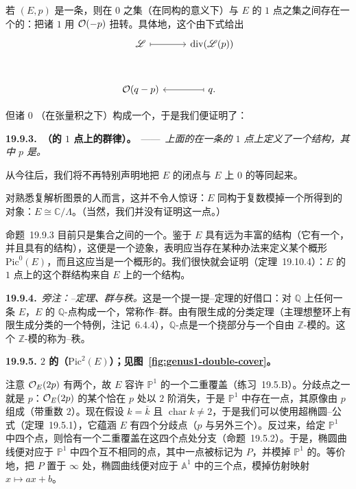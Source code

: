 若 $(E,p)$ 是一条\trEllipticCurve，则在\trDegree{} $0$ \trInvertibleSheaf{}之集（在同构的意义下）与 $E$ 的\trDegree{} $1$ 点之集之间存在一个\trCanonical{}的\trBijection：把诸\trDegree{} $1$ \trLineBundle{}用 $\mathcal{O}(-p)$ 扭转。具体地，这个\trBijection{}由下式给出
\[
\begin{tikzcd}[row sep=3em]
\mathscr{L} \rar[mapsto] & \operatorname{div}(\mathscr{L}(p)) \\
\OO(q-p) & q. \lar[mapsto]
\end{tikzcd}
\]

但诸\trDegree{} $0$ \trInvertibleSheaf{}（在张量积之下）构成一个\trGroup，于是我们便证明了：

\textbf{19.9.3.\ \trhProposition（\trEllipticCurve{}的\trDegree{} $1$ 点上的群律）。}\ ——\ \emph{上面的\trBijection{}在一条\trEllipticCurve{}的\trDegree{} $1$ 点上定义了一个\trAbelianGroups{}结构，其中 $p$ 是\trIdentityPoint。}

从今往后，我们将不再特别声明地把 $E$ 的闭点与 $E$ 上\trDegree{} $0$ 的\trInvertibleSheaf{}等同起来。

对熟悉复解析图景的人而言，这并不令人惊讶：$E$ 同构于复数模掉一个\trLattice{}所得到的对象：$E\cong\mathbb{C}/\Lambda$。（当然，我们并没有证明这一点。）

\mbox{命题~19.9.3} 目前只是集合之间的一个\trBijection。鉴于 $E$ 具有远为丰富的结构（它有一个\trGenericPoint，并且具有\trVariety{}的结构），这便是一个迹象，表明应当存在某种办法来定义某个概形 $\mathrm{Pic}^0(E)$，而且这应当是一个概形的\trIsomorphism。我们很快就会证明（\mbox{定理~19.10.4}）：$E$ 的\trDegree{} $1$ 点上的这个群结构来自 $E$ 上的一个\trGroupVariety{}结构。

\textbf{19.9.4.}\ \emph{旁注：\trMordell--\trWeil{}定理、群与秩。}\quad 这是一个提一提\trMordell--\trWeil{}定理的好借口：对 $\mathbb{Q}$ 上任何一条\trEllipticCurve{} $E$，$E$ 的 $\mathbb{Q}$-点构成一个\trFinitelyGenerated{}\trAbelianGroups，常称作\trMordell--\trWeil{}群。由有限生成\trAbelianGroups{}的分类定理（主理想整环上有限生成\trModule{}分类的一个特例，\mbox{注记~6.4.4}），$\mathbb{Q}$-点是一个挠部分与一个自由 $\mathbb{Z}$-模的\trDirectSum。这个 $\mathbb{Z}$-模的\trRank{}称为\trMordell--\trWeil{}秩。

\textbf{19.9.5. \trDegree{} $2$ 的\trLineBundle{}（$\mathrm{Pic}^2(E)$）；见图~\ref{fig:genus1-double-cover}。}

注意 $\mathcal{O}_E(2p)$ 有两个\trSection，故 $E$ 容许 $\mathbb{P}^1$ 的一个二重覆盖（\mbox{练习~19.5.B}）。分歧点之一就是 $p$：$\mathcal{O}_E(2p)$ 的某个\trSection{}恰在 $p$ 处以 $2$ 阶消失，于是 $\mathbb{P}^1$ 中存在一点，其原像由 $p$ 组成（带重数 $2$）。现在假设 $k=\bar{k}$ 且 $\operatorname{char}k\ne 2$，于是我们可以使用超椭圆\trRiemann--\trHurwitz{}公式（\mbox{定理~19.5.1}），它蕴涵 $E$ 有四个分歧点（$p$ 与另外三个）。反过来，给定 $\mathbb{P}^1$ 中四个点，则恰有一个二重覆盖在这四个点处分支（\mbox{命题~19.5.2}）。于是，椭圆曲线便对应于 $\mathbb{P}^1$ 中四个互不相同的点，其中一点被标记为 $P$，并模掉 $\mathbb{P}^1$ 的\trAutomorphism。等价地，把 $P$ 置于 $\infty$ 处，椭圆曲线便对应于 $\mathbb{A}^1$ 中的三个点，模掉仿射映射 $x\mapsto ax+b$。

